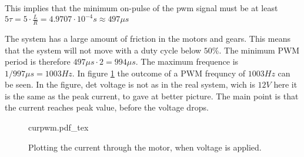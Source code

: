 \documentclass[../../Main]{subfiles}
\begin{document}
This implies that the minimum on-pulse of the pwm signal must be at least $5\tau = 5 \cdot \frac{L}{R} = 4.9707 \cdot 10^{-4}s \approx 497\mu s$

The system has a large amount of friction in the motors and gears. This means that the system will not move with a duty cycle below $50\%$. The minimum PWM period is therefore $497\mu s \cdot 2 = 994\mu s$. The maximum frequence is $1/997\mu s = 1003 Hz$.
In figure \ref{fig:currentplot_pwm} the outcome of a PWM frequncy of $1003Hz$ can be seen.
In the figure, det voltage is not as in the real system, wich is $12V$ here it is the same as the peak current, to gave at better picture. The main point is that the current reaches peak value, before the voltage drops. 

\begin{figure}[H]
\centering
\def\svgwidth{\textwidth}
{curpwm.pdf_tex}
\caption{Plotting the current through the motor, when voltage is applied.}
\label{fig:currentplot_pwm}
\end{figure}
\end{document}
